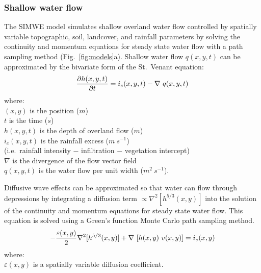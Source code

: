 \documentclass[esurf, manuscript]{copernicus}
\begin{document}

\subsubsection{Shallow water flow}

The SIMWE model
simulates shallow overland water flow
controlled by spatially variable topographic, soil, landcover, and rainfall parameters
by solving the continuity and momentum equations 
for steady state water flow with a path sampling method
(Fig.~\ref{fig:models}a). %
Shallow water flow $q(x,y,t)$ can be approximated by
the bivariate form of the St.~Venant equation:
\begin{equation}
\label{eq:water}
{\partial h(x,y,t) \over \partial t} =
 i_e(x,y,t) - \nabla ~ q(x,y,t)
\end{equation}
{\small
\noindent
where: \\
\noindent
\hspace*{0.5em} $(x,y)$ is the position ($m$)\\
\hspace*{0.5em} $t$ is the time ($s$) \\
\hspace*{0.5em} $h(x,y,t)$ is the depth of overland flow ($m$)\\
\hspace*{0.5em} $i_e(x,y,t)$ is the rainfall excess ($m~s^{-1}$) \\
\hspace*{0.5em} (i.e.~rainfall intensity $-$ infiltration $-$ vegetation intercept)\\
\hspace*{0.5em} $\nabla$ is the divergence of the flow vector field\\
\hspace*{0.5em} $q(x,y,t)$ is the water flow per unit width ($m^2~s^{-1}$). \\
}

Diffusive wave effects can be approximated
so that water can flow through depressions 
by integrating a diffusion term $ \propto \nabla^2 [h^{5/3}(x,y)]$ 
into the solution of the continuity and momentum equations 
for steady state water flow.
This equation is solved using a 
Green's function Monte Carlo path sampling method. 
\begin{equation}
\label{eq:difwater}
-{\varepsilon(x,y)\over 2 }\nabla^2 [h^{5/3}(x,y)]
+\nabla ~ [ h(x,y)~v(x,y)] = i_e(x,y)
\end{equation}
{\small
\noindent
 where: \\
 \noindent
 \hspace*{0.5em} $\varepsilon(x,y)$ is a spatially variable diffusion coefficient. \\
}
\end{document}
